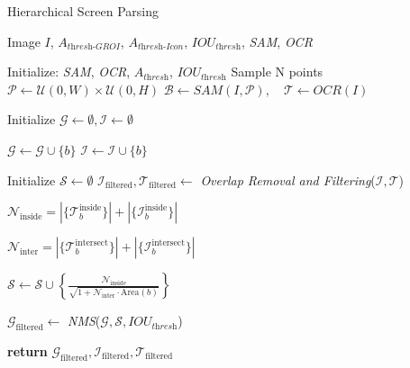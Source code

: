 \begin{algorithm}
\caption{Hierarchical Screen Parsing}\label{alg:groi}
\scriptsize  %
\begin{algorithmic}[1]
    \Require Image $I$, $A_{\textit{thresh-GROI}}$, $A_{\textit{thresh-Icon}}$, $IOU_{\textit{thresh}}$, \textit{SAM}, \textit{OCR}
   
    \State Initialize: \textit{SAM}, \textit{OCR}, $A_{\textit{thresh}}$, $IOU_{\textit{thresh}}$
    \State Sample N points $\mathcal{P} \gets \mathcal{U}(0, W) \times \mathcal{U}(0, H)$ 
    \State $\mathcal{B} \gets \textit{SAM}(I, \mathcal{P}), \quad \mathcal{T} \gets \textit{OCR}(I)$ 
    
    \State Initialize $\mathcal{G} \gets \emptyset, \mathcal{I} \gets \emptyset$ 
    
            \State $\mathcal{G} \gets \mathcal{G} \cup \{b\}$  
        \EndIf
            \State $\mathcal{I} \gets \mathcal{I} \cup \{b\}$ 
        \EndIf
    \EndFor
    
    \State Initialize $\mathcal{S} \gets \emptyset$ 
    \State $\mathcal{I}_{\text{filtered}}, \mathcal{T}_{\text{filtered}} \gets$ \textit{Overlap Removal and Filtering}($\mathcal{I}, \mathcal{T}$)
    
        \State $\mathcal{N}_{\text{inside}} = |\{ \mathcal{T}_b^\text{inside} \}| + |\{ \mathcal{I}_b^\text{inside} \}|$ 
        
        \State $\mathcal{N}_{\text{inter}}  = |\{ \mathcal{T}_b^\text{intersect} \}| + |\{ \mathcal{I}_b^\text{intersect} \}|$
        
        \State $\mathcal{S} \gets \mathcal{S} \cup \left\{ 
        \frac{\mathcal{N}_{\text{inside}}}
        {\sqrt{1 + \mathcal{N}_{\text{inter}} \cdot \text{Area}(b)}} 
        \right\}$     
    \EndFor

    \State $\mathcal{G}_{\text{filtered}} \gets$ \textit{NMS}($\mathcal{G}, \mathcal{S}, IOU_{\textit{thresh}}$) 

    \State \textbf{return} $\mathcal{G}_{\text{filtered}}, \mathcal{I}_{\text{filtered}}, \mathcal{T}_{\text{filtered}}$
\end{algorithmic}
\end{algorithm}

